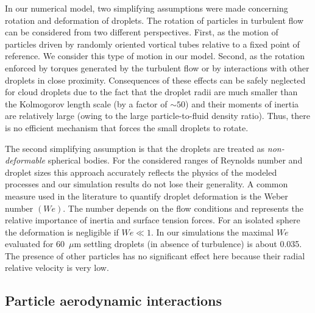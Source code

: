 \documentclass[../thesis.tex]{subfiles}
\begin{document}
In our numerical model, two simplifying assumptions were made concerning rotation and deformation of droplets. The rotation of particles in turbulent flow can be considered from two different perspectives. First, as the motion of particles driven by randomly oriented vortical tubes relative to a fixed point of reference. We consider this type of motion in our model. Second, as the rotation enforced by torques generated by the turbulent flow or by interactions with other droplets in close proximity. Consequences of these effects can be safely neglected for cloud droplets due to the fact that the droplet radii are much smaller than the Kolmogorov length scale (by a factor of $\sim 50$) and their moments of inertia are relatively large (owing to the large particle-to-fluid density ratio). Thus, there is no efficient mechanism that forces the small droplets to rotate. 

The second simplifying assumption is that the droplets are treated as \emph{non-deformable} spherical bodies. For the considered ranges of Reynolds number and droplet sizes this approach accurately reflects the physics of the modeled processes and our simulation results do not lose their generality. A common measure used in the literature to quantify droplet deformation is the Weber number $(We)$. The number depends on the flow conditions and represents the relative importance of inertia and surface tension forces. For an isolated sphere the deformation is negligible if $We \ll 1$. In our simulations the maximal $We$ evaluated for 60~$\mu$m settling droplets (in absence of turbulence) is about 0.035. The presence of other particles has no significant effect here because their radial relative velocity is very low.



\subsection{Particle aerodynamic interactions}
\end{document}
